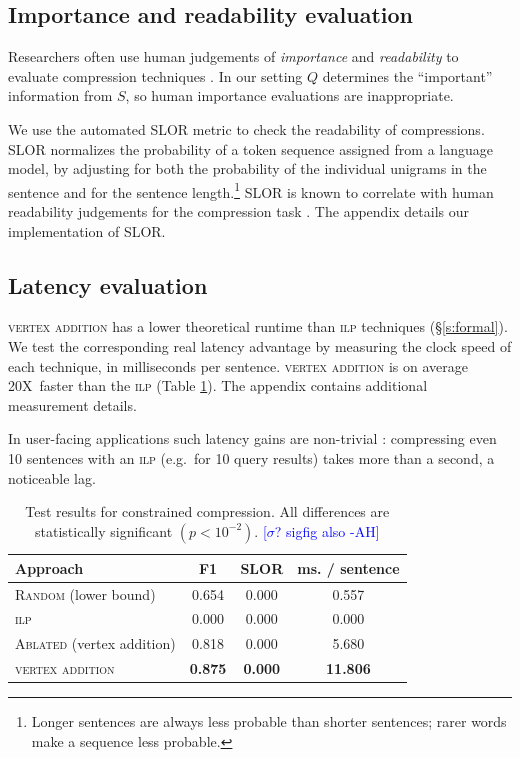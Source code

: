 \documentclass[11pt,a4paper]{article}
\newcommand{\speedup}[0]{20X~}
\newcommand{\ahcomment}[1]{\textcolor{blue}{[#1 -AH]}}
\begin{document}
\subsection{Importance and readability evaluation}\label{s:readabilityinformativeness}

Researchers often use human judgements of \textit{importance} and \textit{readability} to evaluate compression techniques \cite{Knight2000StatisticsBasedS,filippova2015sentence}. In our setting $Q$ determines the ``important'' information from $S$, so human importance evaluations are inappropriate.

We use the automated SLOR metric \cite{lau2015unsupervised} to check the readability of compressions. SLOR normalizes the probability of a token sequence assigned from a language model, by adjusting for both the probability of the individual unigrams in the sentence and for the sentence length.\footnote{Longer sentences are always less probable than shorter sentences; rarer words make a sequence less probable.} SLOR is known to correlate with human readability judgements for the compression task \cite{kannConl}. The appendix details our implementation of SLOR. 

\subsection{Latency evaluation}\label{s:costs}

\textsc{vertex addition} has a lower theoretical runtime than \textsc{ilp} techniques (\S\ref{s:formal}). We test the corresponding real latency advantage by measuring the clock speed of each technique, in milliseconds per sentence. \textsc{vertex addition} is on average \speedup faster than the \textsc{ilp} (Table \ref{t:results}). The appendix contains additional measurement details.

In user-facing applications such latency gains are non-trivial \cite{Nielsen,heerschei,Liu2014TheEO}: compressing even 10 sentences with an \textsc{ilp} (e.g.\ for 10 query results) takes more than a second, a noticeable lag. %

\begin{table}[]
\begin{tabular}{lccc}
\centering
Approach & F1 & SLOR &  ms. / sentence  \\ \hline
\textsc{Random} {\small (lower bound) }&{\small 0.654}&{\small 0.000}&{\small 0.557}\\
\textsc{ilp}&{\small 0.000}&{\small 0.000}&{\small 0.000}\\
\textsc{Ablated}{ \small(vertex addition)} &{\small 0.818}&{\small 0.000}&{\small 5.680}\\
\textsc{vertex addition} &\textbf{\small 0.875}&\textbf{\small 0.000}&\textbf{\small 11.806}\\
\end{tabular}
\caption{Test results for constrained compression. All differences are statistically significant {\small $(p < 10^{-2})$}.
\ahcomment{$\sigma$? sigfig also}}
\label{t:results}
\end{table}
\end{document}
